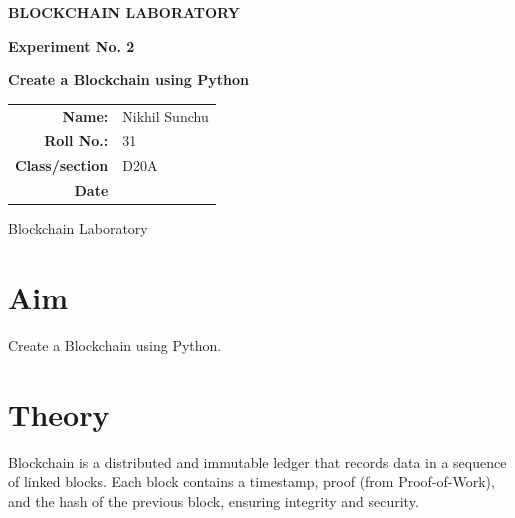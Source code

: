 \documentclass[12pt,a4paper]{article}
\begin{document}
\begin{titlepage}
    \centering
    \vspace*{1.5cm}

    {\Large\bfseries BLOCKCHAIN LABORATORY\par}
    \vspace{1.2cm}

    {\large\bfseries Experiment No. 2\par}
    \vspace{0.8cm}

    {\LARGE\bfseries Create a Blockchain using Python\par}

    \vspace{1cm}

    \begin{tabular}{rl}
    \textbf{Name:} & Nikhil Sunchu \\[0.6cm]
    \textbf{Roll No.:} & 31 \\[0.6cm]
    \textbf{Class/section} & D20A \\[0.6cm]
    \textbf{Date}& \hrulefill \\[0.6cm]
    \end{tabular}

    \vfill
    {\large Blockchain Laboratory\par}
\end{titlepage}

\section{Aim}
Create a Blockchain using Python.

\section{Theory}
Blockchain is a distributed and immutable ledger that records data in a sequence of linked blocks. Each block contains a timestamp, proof (from Proof-of-Work), and the hash of the previous block, ensuring integrity and security.
\end{document}

